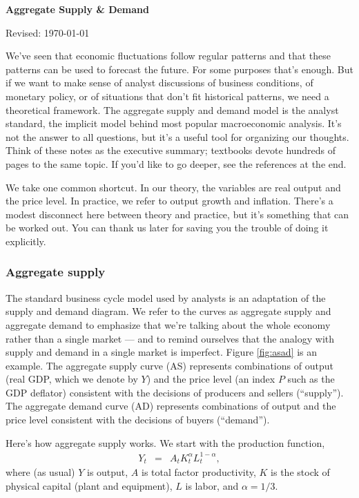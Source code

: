 \documentclass[letterpaper,12pt]{article}
\def\HeadName{Aggregate Supply \& Demand}
\begin{document}
\thispagestyle{empty}%
\Head

\centerline{\large \bf \HeadName}%
\centerline{Revised: \today}

\bigskip
We've seen that economic fluctuations follow regular patterns
and that these patterns can be used to forecast the future.
For some purposes that's enough.
But if we want to make sense of analyst discussions of business conditions,
of monetary policy,
or of situations that don't fit historical patterns,
we need a theoretical framework.
The aggregate supply and demand model is the analyst standard,
the implicit model behind most popular macroeconomic analysis.
It's not the answer to all questions, 
but it's a useful tool for organizing our thoughts.
Think of these notes as the executive summary;
textbooks devote hundreds of pages to the same topic.
If you'd like to go deeper, see the references at the end.

We take one common shortcut.
In our theory, the variables are real output and the price level.
In practice, we refer to output growth and inflation.
There's a modest disconnect here between theory and practice,
but it's something that can be worked out.
You can thank us later for saving you the trouble of
doing it explicitly.


\subsubsection*{Aggregate supply}

The standard business cycle model used by analysts 
is an adaptation of the supply and demand diagram.
We refer to the curves as aggregate supply and aggregate
demand to emphasize that we're talking about the whole economy
rather than a single market ---
and to remind ourselves that the analogy with supply and demand
in a single market is imperfect.
Figure \ref{fig:asad} is an example.
The aggregate supply curve (AS) represents combinations of
output (real GDP, which we denote by $Y$) and the price level
(an index $P$ such as the GDP deflator)
consistent with the decisions of producers and sellers (``supply'').
The aggregate demand curve (AD)
represents combinations of output and the price
level consistent with the decisions of buyers (``demand'').

Here's how aggregate supply works.
We start with the production function,
\begin{eqnarray}
    Y_t &=& A_t K_t^\alpha L_t^{1-\alpha} ,
    \label{eq:pf}
\end{eqnarray}
where (as usual) $Y$ is output, $A$ is total factor productivity,
$K$ is the stock of physical capital (plant and equipment),
$L$ is labor, and $ \alpha = 1/3$.
\end{document}
